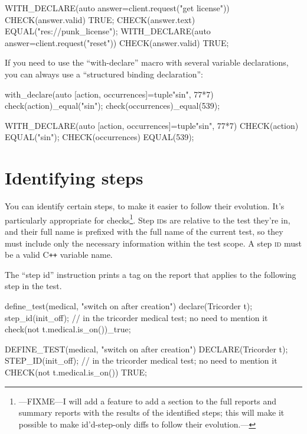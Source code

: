 \documentclass[twoside, a4paper, article]{memoir}
\newcommand*\Cpp{C\texttt{++}}
\begin{document}
\begin{cpplisting}
WITH_DECLARE(auto answer=client.request("get license"))
{
  CHECK(answer.valid) TRUE;
  CHECK(answer.text) EQUAL("res://punk_license");
}
WITH_DECLARE(auto answer=client.request("reset"))
  CHECK(answer.valid) TRUE;
\end{cpplisting}

If you need to use the ``with-declare'' macro with several variable
declarations, you can always use a ``structured binding declaration'':
\begin{cpplisting}
with_declare(auto [action, occurrences]=tuple{"sin", 77*7}) {
  check(action)_equal("sin");
  check(occurrences)_equal(539);
}
\end{cpplisting}

\begin{cpplisting}
WITH_DECLARE(auto [action, occurrences]=tuple{"sin", 77*7})
{
  CHECK(action) EQUAL("sin");
  CHECK(occurrences) EQUAL(539);
}
\end{cpplisting}

\section{Identifying steps}
\label{sec:identifying-steps}

You can identify certain steps, to make it easier to follow their evolution.
It's particularly appropriate for checks\footnote{---FIXME---I will add a
  feature to add a section to the full reports and summary reports with the
  results of the identified steps; this will make it possible to make
  id'd-step-only diffs to follow their evolution.---}.  Step \textsc{id}s are
relative to the test they're in, and their full name is prefixed with the full
name of the current test, so they must include only the necessary information
within the test scope.  A step \textsc{id} must be a valid \Cpp{} variable
name.

The ``step id'' instruction prints a tag on the report that applies to the
following step in the test.
\begin{cpplisting}
define_test(medical, "switch on after creation") {
  declare(Tricorder t);
  step_id(init_off); // in the tricorder medical test; no need to mention it
  check(not t.medical.is_on())_true;
}
\end{cpplisting}

\begin{cpplisting}
DEFINE_TEST(medical, "switch on after creation") {
  DECLARE(Tricorder t);
  STEP_ID(init_off); // in the tricorder medical test; no need to mention it
  CHECK(not t.medical.is_on()) TRUE;
}
\end{cpplisting}
\end{document}
